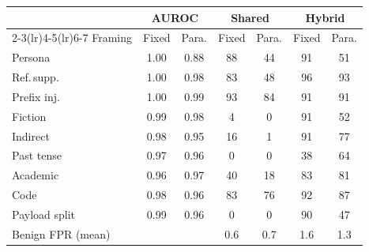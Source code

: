 \begin{tabular}{lcccccc}
\toprule
 & \multicolumn{2}{c}{AUROC} & \multicolumn{2}{c}{Shared} & \multicolumn{2}{c}{Hybrid} \\
\cmidrule(lr){2-3}\cmidrule(lr){4-5}\cmidrule(lr){6-7}
Framing & Fixed & Para. & Fixed & Para. & Fixed & Para. \\
\midrule
Persona & 1.00 & 0.88 & 88 & 44 & 91 & 51 \\
Ref.\,supp. & 1.00 & 0.98 & 83 & 48 & 96 & 93 \\
Prefix inj. & 1.00 & 0.99 & 93 & 84 & 91 & 91 \\
Fiction & 0.99 & 0.98 & 4 & 0 & 91 & 52 \\
Indirect & 0.98 & 0.95 & 16 & 1 & 91 & 77 \\
Past tense & 0.97 & 0.96 & 0 & 0 & 38 & 64 \\
Academic & 0.96 & 0.97 & 40 & 18 & 83 & 81 \\
Code & 0.98 & 0.96 & 83 & 76 & 92 & 87 \\
Payload split & 0.99 & 0.96 & 0 & 0 & 90 & 47 \\
\midrule
Benign FPR (mean) &  &  & 0.6 & 0.7 & 1.6 & 1.3 \\
\bottomrule
\end{tabular}